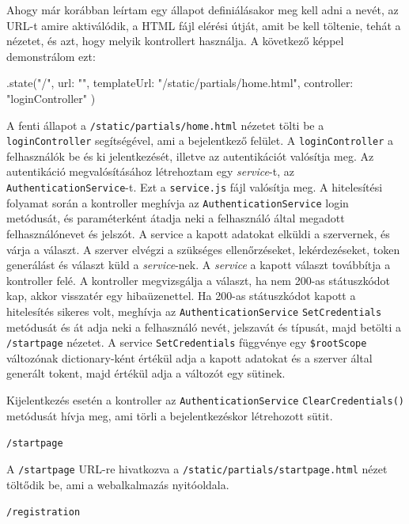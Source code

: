 Ahogy már korábban leírtam egy állapot definiálásakor meg kell adni a nevét, az URL-t amire aktiválódik, a HTML fájl elérési útját, amit be kell töltenie, tehát a nézetet, és azt, hogy melyik kontrollert használja. A következő képpel demonstrálom ezt:

\begin{cpp}
.state("/", {
    url: "",
    templateUrl: "/static/partials/home.html",
    controller: "loginController"
})
\end{cpp}

A fenti állapot a \texttt{/static/partials/home.html} nézetet tölti be a \texttt{loginController} segítségével, ami a bejelentkező felület. A \texttt{loginController} a felhasználók be és ki jelentkezését, illetve az autentikációt valósítja meg. Az autentikáció megvalósításához létrehoztam egy \textit{service}-t, az \texttt{AuthenticationService}-t. Ezt a \texttt{service.js} fájl valósítja meg. A hitelesítési folyamat során a kontroller meghívja az \texttt{AuthenticationService} login metódusát, és paraméterként átadja neki a felhasználó által megadott felhasználónevet és jelszót. A service a kapott adatokat elküldi a szervernek, és várja a választ. A szerver elvégzi a szükséges ellenőrzéseket, lekérdezéseket, token generálást és választ küld a \textit{service}-nek. A \textit{service} a kapott választ továbbítja a kontroller felé. A kontroller megvizsgálja a választ, ha nem 200-as státuszkódot kap, akkor visszatér egy hibaüzenettel. Ha 200-as státuszkódot kapott a hitelesítés sikeres volt, meghívja az \texttt{AuthenticationService} \texttt{SetCredentials} metódusát és át adja neki a felhasználó nevét, jelszavát és típusát, majd betölti a \texttt{/startpage} nézetet. A service \texttt{SetCredentials} függvénye egy \texttt{\$rootScope} változónak dictionary-ként értékül adja a kapott adatokat és a szerver által generált tokent, majd értékül adja a változót egy sütinek.

Kijelentkezés esetén a kontroller az \texttt{AuthenticationService} \texttt{ClearCredentials()} metódusát hívja meg, ami törli a bejelentkezéskor létrehozott sütit.

\bigskip

\noindent \texttt{/startpage}

A \texttt{/startpage} URL-re hivatkozva a \texttt{/static/partials/startpage.html} nézet töltődik be, ami a webalkalmazás nyitóoldala.

\bigskip

\noindent \texttt{/registration}

